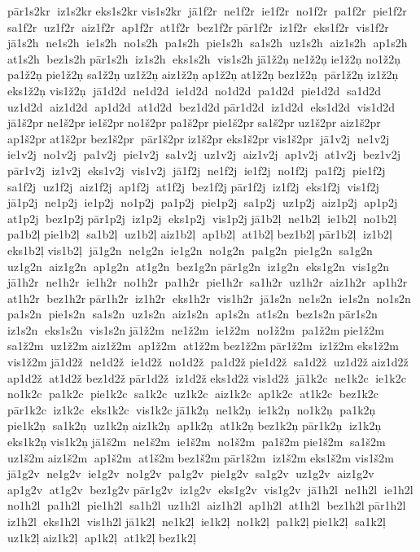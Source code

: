  pār1s2kr  iz1s2kr 	 eks1s2kr 	 vis1s2kr  jā1f2r  ne1f2r  ie1f2r  no1f2r  pa1f2r  pie1f2r  sa1f2r  uz1f2r  aiz1f2r  ap1f2r  at1f2r  bez1f2r 	 pār1f2r  iz1f2r  eks1f2r  vis1f2r  jā1s2h  ne1s2h  ie1s2h  no1s2h  pa1s2h  pie1s2h  sa1s2h  uz1s2h  aiz1s2h  ap1s2h  at1s2h  bez1s2h 	 pār1s2h  iz1s2h  eks1s2h  vis1s2h 
 jā1ž2ņ 	 ne1ž2ņ 	 ie1ž2ņ 	 no1ž2ņ 	 pa1ž2ņ 
 pie1ž2ņ 	 sa1ž2ņ 	 uz1ž2ņ 
 aiz1ž2ņ 	 ap1ž2ņ 	 at1ž2ņ 
 bez1ž2ņ  pār1ž2ņ 	 iz1ž2ņ 
 eks1ž2ņ 
 vis1ž2ņ  jā1d2d  ne1d2d  ie1d2d  no1d2d  pa1d2d  pie1d2d  sa1d2d  uz1d2d  aiz1d2d  ap1d2d  at1d2d  bez1d2d 	 pār1d2d  iz1d2d  eks1d2d  vis1d2d 
 jā1š2pr 	 ne1š2pr 	 ie1š2pr 	 no1š2pr 	 pa1š2pr 
 pie1š2pr 	 sa1š2pr 	 uz1š2pr 
 aiz1š2pr 	 ap1š2pr 	 at1š2pr 
 bez1š2pr  pār1š2pr 	 iz1š2pr 
 eks1š2pr 
 vis1š2pr  jā1v2j  ne1v2j  ie1v2j  no1v2j  pa1v2j  pie1v2j  sa1v2j  uz1v2j  aiz1v2j  ap1v2j  at1v2j  bez1v2j 	 pār1v2j  iz1v2j  eks1v2j  vis1v2j  jā1f2j  ne1f2j  ie1f2j  no1f2j  pa1f2j  pie1f2j  sa1f2j  uz1f2j  aiz1f2j  ap1f2j  at1f2j  bez1f2j 	 pār1f2j  iz1f2j  eks1f2j  vis1f2j  jā1p2j  ne1p2j  ie1p2j  no1p2j  pa1p2j  pie1p2j  sa1p2j  uz1p2j  aiz1p2j  ap1p2j  at1p2j  bez1p2j 	 pār1p2j  iz1p2j  eks1p2j  vis1p2j 	 jā1b2ļ  ne1b2ļ  ie1b2ļ  no1b2ļ  pa1b2ļ 	 pie1b2ļ  sa1b2ļ  uz1b2ļ 	 aiz1b2ļ  ap1b2ļ  at1b2ļ 	 bez1b2ļ 
 pār1b2ļ  iz1b2ļ 	 eks1b2ļ 	 vis1b2ļ  jā1g2n  ne1g2n  ie1g2n  no1g2n  pa1g2n  pie1g2n  sa1g2n  uz1g2n  aiz1g2n  ap1g2n  at1g2n  bez1g2n 	 pār1g2n  iz1g2n  eks1g2n  vis1g2n  jā1h2r  ne1h2r  ie1h2r  no1h2r  pa1h2r  pie1h2r  sa1h2r  uz1h2r  aiz1h2r  ap1h2r  at1h2r  bez1h2r 	 pār1h2r  iz1h2r  eks1h2r  vis1h2r  jā1s2n  ne1s2n  ie1s2n  no1s2n  pa1s2n  pie1s2n  sa1s2n  uz1s2n  aiz1s2n  ap1s2n  at1s2n  bez1s2n 	 pār1s2n  iz1s2n  eks1s2n  vis1s2n 	 jā1ž2m  ne1ž2m  ie1ž2m  no1ž2m  pa1ž2m 	 pie1ž2m  sa1ž2m  uz1ž2m 	 aiz1ž2m  ap1ž2m  at1ž2m 	 bez1ž2m 
 pār1ž2m  iz1ž2m 	 eks1ž2m 	 vis1ž2m 	 jā1d2ž  ne1d2ž  ie1d2ž  no1d2ž  pa1d2ž 	 pie1d2ž  sa1d2ž  uz1d2ž 	 aiz1d2ž  ap1d2ž  at1d2ž 	 bez1d2ž 
 pār1d2ž  iz1d2ž 	 eks1d2ž 	 vis1d2ž  jā1k2c  ne1k2c  ie1k2c  no1k2c  pa1k2c  pie1k2c  sa1k2c  uz1k2c  aiz1k2c  ap1k2c  at1k2c  bez1k2c 	 pār1k2c  iz1k2c  eks1k2c  vis1k2c 	 jā1k2ņ  ne1k2ņ  ie1k2ņ  no1k2ņ  pa1k2ņ 	 pie1k2ņ  sa1k2ņ  uz1k2ņ 	 aiz1k2ņ  ap1k2ņ  at1k2ņ 	 bez1k2ņ 
 pār1k2ņ  iz1k2ņ 	 eks1k2ņ 	 vis1k2ņ 	 jā1š2m  ne1š2m  ie1š2m  no1š2m  pa1š2m 	 pie1š2m  sa1š2m  uz1š2m 	 aiz1š2m  ap1š2m  at1š2m 	 bez1š2m 
 pār1š2m  iz1š2m 	 eks1š2m 	 vis1š2m  jā1g2v  ne1g2v  ie1g2v  no1g2v  pa1g2v  pie1g2v  sa1g2v  uz1g2v  aiz1g2v  ap1g2v  at1g2v  bez1g2v 	 pār1g2v  iz1g2v  eks1g2v  vis1g2v  jā1h2l  ne1h2l  ie1h2l  no1h2l  pa1h2l  pie1h2l  sa1h2l  uz1h2l  aiz1h2l  ap1h2l  at1h2l  bez1h2l 	 pār1h2l  iz1h2l  eks1h2l  vis1h2l 	 jā1k2ļ  ne1k2ļ  ie1k2ļ  no1k2ļ  pa1k2ļ 	 pie1k2ļ  sa1k2ļ  uz1k2ļ 	 aiz1k2ļ  ap1k2ļ  at1k2ļ 	 bez1k2ļ 
